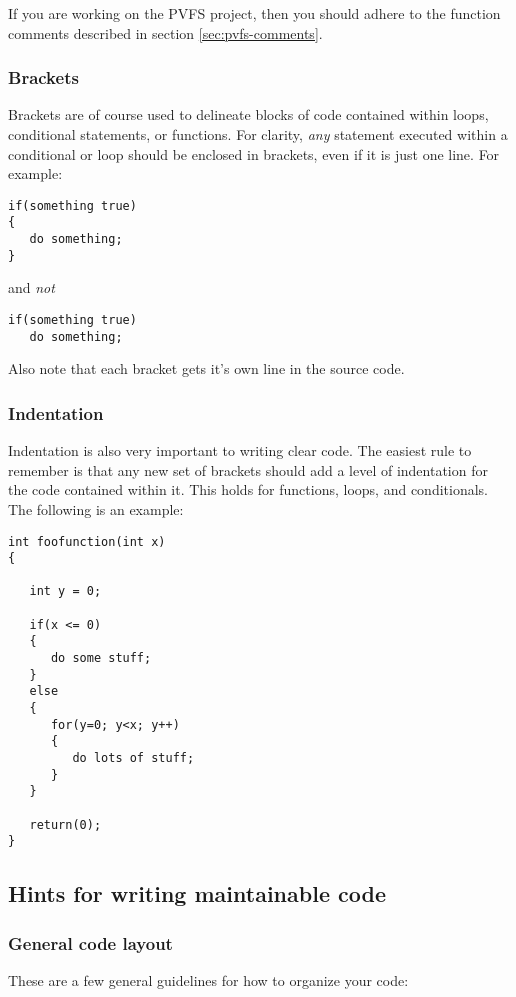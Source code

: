 \documentclass[11pt, letterpaper]{article}
\begin{document}
If you are working on the PVFS project, then you should adhere to the
function comments described in section \ref{sec:pvfs-comments}.

\subsubsection{Brackets}

Brackets are of course used to delineate blocks of code contained within
loops, conditional statements, or functions.  For clarity, \emph{any}
statement executed within a conditional or loop should be enclosed in
brackets, even if it is just one line.  For example:

\begin{verbatim}
if(something true)
{
   do something;
}
\end{verbatim}
and \emph{not}
\begin{verbatim}
if(something true) 
   do something;
\end{verbatim}

Also note that each bracket gets it's own line in the source code.  

\subsubsection{Indentation}

\label{sec:indent}
Indentation is also very important to writing clear code.  The easiest
rule to remember is that any new set of brackets should add a level of
indentation for the code contained within it.  This holds for functions,
loops, and conditionals.  The following is an example:

\begin{verbatim}
int foofunction(int x)
{

   int y = 0;

   if(x <= 0)
   {
      do some stuff;
   }
   else
   {
      for(y=0; y<x; y++)
      {
         do lots of stuff;
      }
   }

   return(0);
}
\end{verbatim}

\subsection{Hints for writing maintainable code}

\subsubsection{General code layout}
\label{sec:proto}
These are a few general guidelines for how to organize your code:
\end{document}
